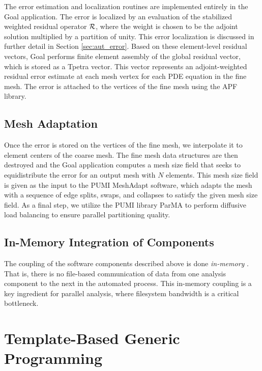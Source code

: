 The error estimation and localization routines are implemented entirely in
the Goal application. The error is localized by an evaluation of the
stabilized weighted residual operator $\mathcal{R}$, where the weight is chosen to be
the adjoint solution multiplied by a partition of unity. This error
localization is discussed in further detail in Section
\ref{sec:aut_error}. Based on these
element-level residual vectors, Goal performs finite element assembly
of the global residual vector, which is stored as a Tpetra vector. This
vector represents an adjoint-weighted residual error estimate at each mesh
vertex for each PDE equation in the fine mesh. The error is attached to the
vertices of the fine mesh using the APF library.

\subsection{Mesh Adaptation}

Once the error is stored on the vertices of the fine mesh, we interpolate
it to element centers of the coarse mesh. The fine mesh data structures are
then destroyed and the Goal application computes a mesh size field that
seeks to equidistribute the error for an output mesh with $N$ elements. This
mesh size field is given as the input to the PUMI MeshAdapt software, which
adapts the mesh with a sequence of edge splits, swaps, and collapses
\cite{li20053d, alauzet2006parallel} to satisfy the given mesh size field.
As a final step, we utilize the PUMI library ParMA
\cite{smith2015parma, diamond2017dynamic}
to perform diffusive
load balancing to ensure parallel partitioning quality.

\subsection{In-Memory Integration of Components}

The coupling of the software components described above is done \emph{in-memory}
\cite{smith2016memory}. That is, there is no file-based communication of
data from one analysis component to the next in the automated process.
This in-memory coupling is a key ingredient for parallel analysis,
where filesystem bandwidth is a critical bottleneck.

\section{Template-Based Generic Programming}
\label{sec:tbgp}

